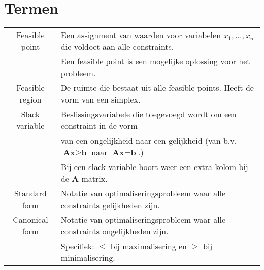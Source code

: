 \documentclass[10pt,a4paper]{article}
\begin{document}
\section*{Termen}
\begin{tabular}{|c|l|}
\hline
Feasible point & Een assignment van waarden voor variabelen $x_1, ..., x_n$ die voldoet aan alle constraints. \\ 
& Een feasible point is een mogelijke oplossing voor het probleem.\\
\hline
Feasible region & De ruimte die bestaat uit alle feasible points. Heeft de vorm van een simplex. \\
\hline
Slack variable & Beslissingsvariabele die toegevoegd wordt om een constraint in de vorm \\ &van een ongelijkheid naar een gelijkheid (van b.v. $\textbf{Ax} \geq \textbf{b}$ naar $\textbf{Ax} = \textbf{b}$.)\\
& Bij een slack variable hoort weer een extra kolom bij de $\textbf{A}$ matrix. \\
\hline
Standard form & Notatie van optimaliseringsprobleem waar alle constraints gelijkheden zijn.\\
\hline
Canonical form & Notatie van optimaliseringsprobleem waar alle constraints ongelijkheden zijn.\\
 & Specifiek: $\le$ bij maximalisering en $\geq$ bij minimalisering. \\
\hline
\end{tabular} 
\end{document}
